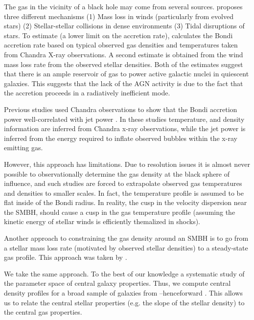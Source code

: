\documentclass[usenatbib,fleqn]{mn2e}
\begin{document}
The gas in the vicinity of a black hole may come from several sources. \citealt{Ho:2009a} proposes three different mechanisms (1) Mass loss in winds (particularly from evolved stars) (2) Stellar-stellar collisions in dense environments (3) Tidal disruptions of stars. To estimate (a lower limit on the accretion rate), \citealt{Ho:2009a} calculates the Bondi accretion rate based on typical observed gas densities and temperatures taken from Chandra X-ray observations. A second estimate is obtained from the wind mass loss rate from the observed stellar densities. Both of the estimates suggest that there is an ample reservoir of gas to power active galactic nuclei in quiescent galaxies. This suggests that the lack of the AGN activity is due to the fact that the accretion proceeds in a radiatively inefficient mode. 

Previous studies used Chandra observations to show that the Bondi accretion power well-correlated with jet power \citep{AllenDunn+:2006a,FujitaKawakatu+:2014a}. In these studies temperature, and density information are inferred from Chandra x-ray observations, while the jet power is inferred from the energy required to inflate observed bubbles within the x-ray emitting gas. 

However, this approach has limitations. Due to resolution issues it is almost never possible to observationally determine the gas density at the black sphere of influence, and such studies are forced to extrapolate observed gas temperatures and densities to smaller scales.  In fact, the temperature profile is assumed to be flat inside of the Bondi radius.  In reality, the cusp in the velocity dispersion near the SMBH, should cause a cusp in the gas temperature profile (assuming the kinetic energy of stellar winds is efficiently themalized in shocks). 

Another approach to constraining the gas density around an SMBH is to go from a stellar mass loss rate (motivated by observed stellar densities) to a steady-state gas profile. This approach was taken by \citealt{Quataert:2004a,De-ColleGuillochon+:2012a,ShcherbakovWong+:2014a}.  

We take the same approach. To the best of our knowledge a systematic study of the parameter space of central galaxy properties. Thus, we compute central density profiles for a broad sample of galaxies from \citealt{WangMerritt:2004a}--henceforward .  This allows us to relate the central stellar properties (e.g. the slope of the stellar density) to the central gas properties.  
\end{document}
